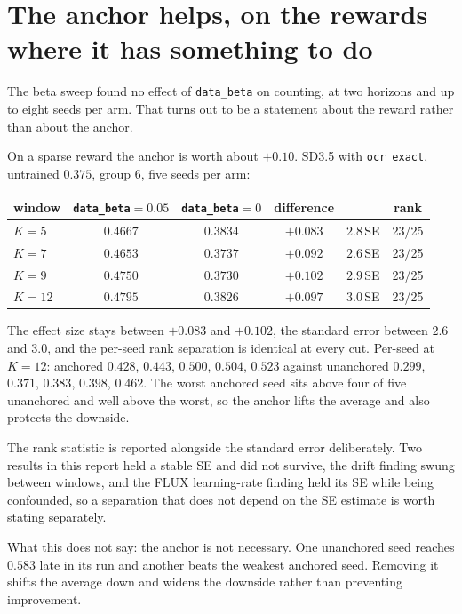 \documentclass[11pt]{article}
\newcommand{\code}[1]{\texttt{\small #1}}
\begin{document}
\section{The anchor helps, on the rewards where it has something to do}

The beta sweep found no effect of \code{data\_beta} on counting, at two horizons and up to eight seeds per arm. That turns out to be a statement about the reward rather than about the anchor.

On a sparse reward the anchor is worth about $+0.10$. SD3.5 with \code{ocr\_exact}, untrained $0.375$, group 6, five seeds per arm:

\begin{center}
\begin{tabular}{lccccc}
\toprule
window & \code{data\_beta}$=0.05$ & \code{data\_beta}$=0$ & difference & & rank \\
\midrule
$K{=}5$ & $0.4667$ & $0.3834$ & $+0.083$ & $2.8$\,SE & 23/25 \\
$K{=}7$ & $0.4653$ & $0.3737$ & $+0.092$ & $2.6$\,SE & 23/25 \\
$K{=}9$ & $0.4750$ & $0.3730$ & $+0.102$ & $2.9$\,SE & 23/25 \\
$K{=}12$ & $0.4795$ & $0.3826$ & $+0.097$ & $3.0$\,SE & 23/25 \\
\bottomrule
\end{tabular}
\end{center}

\noindent The effect size stays between $+0.083$ and $+0.102$, the standard error between $2.6$ and $3.0$, and the per-seed rank separation is identical at every cut. Per-seed at $K{=}12$: anchored $0.428$, $0.443$, $0.500$, $0.504$, $0.523$ against unanchored $0.299$, $0.371$, $0.383$, $0.398$, $0.462$. The worst anchored seed sits above four of five unanchored and well above the worst, so the anchor lifts the average and also protects the downside.

The rank statistic is reported alongside the standard error deliberately. Two results in this report held a stable SE and did not survive, the drift finding swung between windows, and the FLUX learning-rate finding held its SE while being confounded, so a separation that does not depend on the SE estimate is worth stating separately.

What this does not say: the anchor is not necessary. One unanchored seed reaches $0.583$ late in its run and another beats the weakest anchored seed. Removing it shifts the average down and widens the downside rather than preventing improvement.
\end{document}
